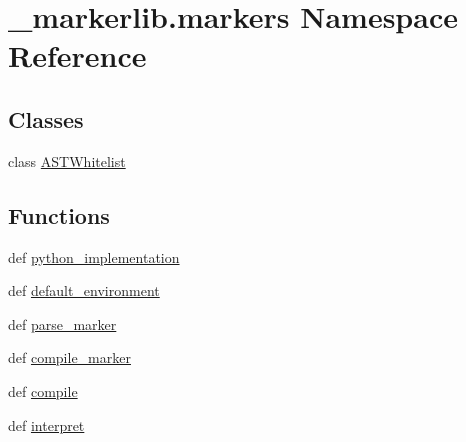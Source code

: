 \hypertarget{namespace__markerlib_1_1markers}{}\section{\+\_\+markerlib.\+markers Namespace Reference}
\label{namespace__markerlib_1_1markers}
\subsection*{Classes}
\begin{DoxyCompactItemize}
\item 
class \hyperlink{class__markerlib_1_1markers_1_1ASTWhitelist}{A\+S\+T\+Whitelist}
\end{DoxyCompactItemize}
\subsection*{Functions}
\begin{DoxyCompactItemize}
\item 
def \hyperlink{namespace__markerlib_1_1markers_a15c16a81770bf7bb8a423368b081ac89}{python\+\_\+implementation}
\item 
def \hyperlink{namespace__markerlib_1_1markers_ab63f82b3567ece3673ded0c8f07b6d9e}{default\+\_\+environment}
\item 
def \hyperlink{namespace__markerlib_1_1markers_a68fb85cf09b724751ec1c42702d18ab8}{parse\+\_\+marker}
\item 
def \hyperlink{namespace__markerlib_1_1markers_a4c322c0902e061f27036b0d8b3afa329}{compile\+\_\+marker}
\item 
def \hyperlink{namespace__markerlib_1_1markers_a1df2208909a9aec48221c29236afe3b2}{compile}
\item 
def \hyperlink{namespace__markerlib_1_1markers_acf5cf648f4de9cee183291a7df7a1b10}{interpret}
\end{DoxyCompactItemize}
